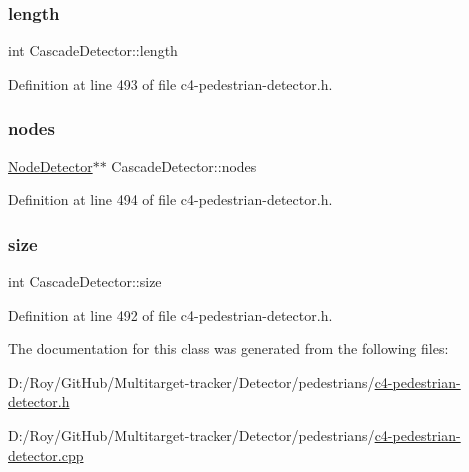 \subsubsection{\texorpdfstring{length}{length}}
{\footnotesize\ttfamily int Cascade\+Detector\+::length}



Definition at line 493 of file c4-\/pedestrian-\/detector.\+h.

\mbox{\label{class_cascade_detector_a7977422f255cf4d753665c0c6a0b0f07}} 
\subsubsection{\texorpdfstring{nodes}{nodes}}
{\footnotesize\ttfamily \mbox{\hyperlink{class_node_detector}{Node\+Detector}}$\ast$$\ast$ Cascade\+Detector\+::nodes}



Definition at line 494 of file c4-\/pedestrian-\/detector.\+h.

\mbox{\label{class_cascade_detector_a4a1280062076bdea7b404e9fca3a53a4}} 
\subsubsection{\texorpdfstring{size}{size}}
{\footnotesize\ttfamily int Cascade\+Detector\+::size}



Definition at line 492 of file c4-\/pedestrian-\/detector.\+h.



The documentation for this class was generated from the following files\+:\begin{DoxyCompactItemize}
\item 
D\+:/\+Roy/\+Git\+Hub/\+Multitarget-\/tracker/\+Detector/pedestrians/\mbox{\hyperlink{c4-pedestrian-detector_8h}{c4-\/pedestrian-\/detector.\+h}}\item 
D\+:/\+Roy/\+Git\+Hub/\+Multitarget-\/tracker/\+Detector/pedestrians/\mbox{\hyperlink{c4-pedestrian-detector_8cpp}{c4-\/pedestrian-\/detector.\+cpp}}\end{DoxyCompactItemize}
